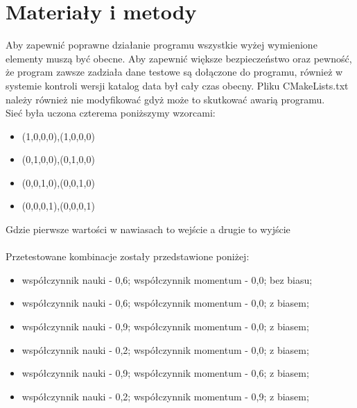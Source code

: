 \documentclass{classrep}
\begin{document}
    \section{Materiały i metody}
    {
        Aby zapewnić poprawne działanie programu wszystkie wyżej wymienione elementy muszą być obecne. Aby zapewnić większe
        bezpieczeństwo oraz pewność, że program zawsze zadziała dane testowe są dołączone do programu, również w systemie
        kontroli wersji katalog data był cały czas obecny. Pliku CMakeLists.txt należy również nie modyfikować gdyż może
        to skutkować awarią programu.\\

        Sieć była uczona czterema poniższymy wzorcami:
        \begin{itemize}
            \item (1,0,0,0),(1,0,0,0)
            \item (0,1,0,0),(0,1,0,0)
            \item (0,0,1,0),(0,0,1,0)
            \item (0,0,0,1),(0,0,0,1)
        \end{itemize}

        Gdzie pierwsze wartości w nawiasach to wejście a drugie to wyjście \\\\

        Przetestowane kombinacje zostały przedstawione poniżej:
        \begin{itemize}
            \item współczynnik nauki - 0,6; współczynnik momentum - 0,0; bez biasu;
            \item współczynnik nauki - 0,6; współczynnik momentum - 0,0; z biasem;
            \item współczynnik nauki - 0,9; współczynnik momentum - 0,0; z biasem;
            \item współczynnik nauki - 0,2; współczynnik momentum - 0,0; z biasem;
            \item współczynnik nauki - 0,9; współczynnik momentum - 0,6; z biasem;
            \item współczynnik nauki - 0,2; współczynnik momentum - 0,9; z biasem;
        \end{itemize}
    }
\end{document}

